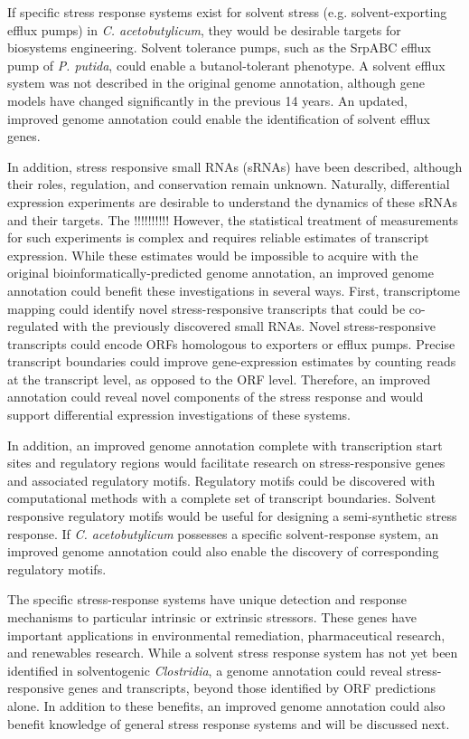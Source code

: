 If specific stress response systems exist for solvent stress (e.g. solvent-exporting efflux pumps) in \textit{C. acetobutylicum}, they would be desirable targets for biosystems engineering. Solvent tolerance pumps, such as the SrpABC efflux pump of \textit{P. putida}, could enable a butanol-tolerant phenotype.\cite{202} A solvent efflux system was not described in the original genome annotation,\cite{91} although gene models have changed significantly in the previous 14 years. An updated, improved genome annotation could enable the identification of solvent efflux genes.

In addition, stress responsive small RNAs (sRNAs) have been described,\cite{39} although their roles, regulation, and conservation remain unknown. Naturally, differential expression experiments are desirable to understand the dynamics of these sRNAs and their targets. The !!!!!!!!!! However, the statistical treatment of measurements for such experiments is complex and requires reliable estimates of transcript expression.\cite{111,112,198} While these estimates would be impossible to acquire with the original bioinformatically-predicted genome annotation, an improved genome annotation could benefit these investigations in several ways. First, transcriptome mapping could identify novel stress-responsive transcripts that could be co-regulated with the previously discovered small RNAs.\cite{39} Novel stress-responsive transcripts could encode ORFs homologous to exporters or efflux pumps. Precise transcript boundaries could improve gene-expression estimates by counting reads at the transcript level, as opposed to the ORF level. Therefore, an improved annotation could reveal novel components of the stress response and would support differential expression investigations of these systems.

In addition, an improved genome annotation complete with transcription start sites and regulatory regions would facilitate research on stress-responsive genes and associated regulatory motifs. Regulatory motifs could be discovered with computational methods\cite{5,35} with a complete set of transcript boundaries.\cite{105,106,107} Solvent responsive regulatory motifs would be useful for designing a semi-synthetic stress response.\cite{45,46} If \textit{C. acetobutylicum} possesses a specific solvent-response system, an improved genome annotation could also enable the discovery of corresponding regulatory motifs.

The specific stress-response systems have unique detection and response mechanisms to particular intrinsic or extrinsic stressors. These genes have important applications in environmental remediation,\cite{128} pharmaceutical research,\cite{127} and renewables research. While a solvent stress response system has not yet been identified in solventogenic \textit{Clostridia}, a genome annotation could reveal stress-responsive genes and transcripts, beyond those identified by ORF predictions alone. In addition to these benefits, an improved genome annotation could also benefit knowledge of general stress response systems and will be discussed next. 


